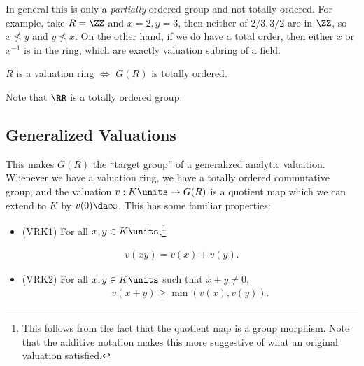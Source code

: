 \begin{remark}

In general this is only a \emph{partially} ordered group and not totally
ordered. For example, take \(R = \ZZ\) and \(x=2, y=3\), then neither of
\(2/3, 3/2\) are in \(\ZZ\), so \(x\not\leq y\) and \(y\not\leq x\). On
the other hand, if we do have a total order, then either \(x\) or
\(x^{-1}\) is in the ring, which are exactly valuation subring of a
field.

\end{remark}

\begin{claim}

\(R\) is a valuation ring \(\iff\) \(G(R)\) is totally ordered.

\end{claim}

\begin{remark}

Note that \(\RR\) is a totally ordered group.

\end{remark}

\hypertarget{generalized-valuations}{%
\subsection{Generalized Valuations}\label{generalized-valuations}}

This makes \(G(R)\) the ``target group'' of a generalized analytic
valuation. Whenever we have a valuation ring, we have a totally ordered
commutative group, and the valuation \(v: K\units \to G(R)\) is a
quotient map which we can extend to \(K\) by \(v(0) \da \infty\). This
has some familiar properties:

\begin{itemize}
\tightlist
\item
  (VRK1) For all \(x,y\in K\units\),\footnote{This follows from the fact
    that the quotient map is a group morphism. Note that the additive
    notation makes this more suggestive of what an original valuation
    satisfied.}
\end{itemize}

\begin{align*}  
v(xy) = v(x) + v(y)
.\end{align*}

\begin{itemize}
\tightlist
\item
  (VRK2) For all \(x,y \in K\units\) such that \(x+y\neq 0\),
  \begin{align*}  
  v(x+y) \geq \min(v(x), v(y))
  .\end{align*}
\end{itemize}

